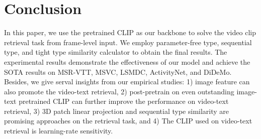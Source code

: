\documentclass[11pt]{article}
\begin{document}
	\section{Conclusion}
	In this paper, we use the pretrained CLIP as our backbone to solve the video clip retrieval task from frame-level input. We employ parameter-free type, sequential type, and tight type similarity calculator to obtain the final results. The experimental results demonstrate the effectiveness of our model and achieve the SOTA results on MSR-VTT, MSVC, LSMDC, ActivityNet, and DiDeMo. Besides, we give serval insights from our empirical studies: 1) image feature can also promote the video-text retrieval, 2) post-pretrain on even outstanding image-text pretrained CLIP can further improve the performance on video-text retrieval, 3) 3D patch linear projection and sequential type similarity are promising approaches on the retrieval task, and 4) The CLIP used on video-text retrieval is learning-rate sensitivity.
	

	

	\clearpage
	\appendix
	\setcounter{table}{0}
	\renewcommand{\thetable}{A\arabic{table}}
\end{document}
